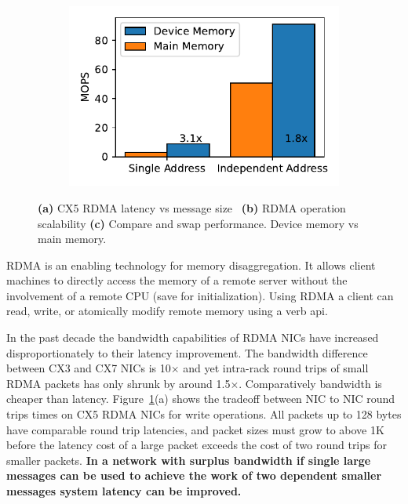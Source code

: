 \begin{figure}[t]
\begin{subfigure}{0.3\linewidth}
        \includegraphics[width=0.99\linewidth]{fig/rdma_cas_throughput.pdf}
    \end{subfigure}
    \vspace{-1em}
    \caption{
    \textbf{(a)} CX5 RDMA latency vs message size~\cite{rdma-latency}
    \textbf{(b)} RDMA operation scalability
    \textbf{(c)} Compare and swap performance. Device memory vs main memory.
    }
    \label{fig:rdma-benchmarks}
\end{figure}

RDMA is an enabling technology for memory disaggregation. It
allows client machines to directly access the memory of a
remote server without the involvement of a remote CPU (save
for initialization).  Using RDMA a client can read, write, or
atomically modify remote memory using a verb api.

In the past decade the bandwidth capabilities of RDMA NICs
have increased disproportionately to their latency
improvement. The bandwidth difference between CX3 and CX7
NICs is 10$\times$ and yet intra-rack round trips of small
RDMA packets has only shrunk by around 1.5$\times$.
Comparatively bandwidth is cheaper than latency.
Figure~\ref{fig:rdma-benchmarks}(a) shows the tradeoff
between NIC to NIC round trips times on CX5 RDMA NICs for
write operations. All packets up to 128 bytes have
comparable round trip latencies, and packet sizes must grow
to above 1K before the latency cost of a large packet
exceeds the cost of two round trips for smaller packets.
\textbf{In a network with surplus bandwidth if single large
messages can be used to achieve the work of two dependent
smaller messages system latency can be improved.}

